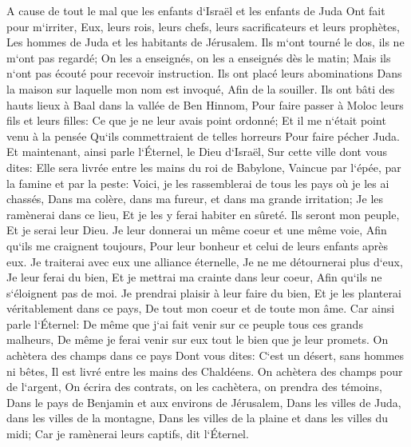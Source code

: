 \verse A cause de tout le mal que les enfants d`Israël et les enfants de Juda Ont fait pour m`irriter, Eux, leurs rois, leurs chefs, leurs sacrificateurs et leurs prophètes, Les hommes de Juda et les habitants de Jérusalem. 
\verse Ils m`ont tourné le dos, ils ne m`ont pas regardé; On les a enseignés, on les a enseignés dès le matin; Mais ils n`ont pas écouté pour recevoir instruction. 
\verse Ils ont placé leurs abominations Dans la maison sur laquelle mon nom est invoqué, Afin de la souiller. 
\verse Ils ont bâti des hauts lieux à Baal dans la vallée de Ben Hinnom, Pour faire passer à Moloc leurs fils et leurs filles: Ce que je ne leur avais point ordonné; Et il me n`était point venu à la pensée Qu`ils commettraient de telles horreurs Pour faire pécher Juda. 
\verse Et maintenant, ainsi parle l`Éternel, le Dieu d`Israël, Sur cette ville dont vous dites: Elle sera livrée entre les mains du roi de Babylone, Vaincue par l`épée, par la famine et par la peste: 
\verse Voici, je les rassemblerai de tous les pays où je les ai chassés, Dans ma colère, dans ma fureur, et dans ma grande irritation; Je les ramènerai dans ce lieu, Et je les y ferai habiter en sûreté. 
\verse Ils seront mon peuple, Et je serai leur Dieu. 
\verse Je leur donnerai un même coeur et une même voie, Afin qu`ils me craignent toujours, Pour leur bonheur et celui de leurs enfants après eux. 
\verse Je traiterai avec eux une alliance éternelle, Je ne me détournerai plus d`eux, Je leur ferai du bien, Et je mettrai ma crainte dans leur coeur, Afin qu`ils ne s`éloignent pas de moi. 
\verse Je prendrai plaisir à leur faire du bien, Et je les planterai véritablement dans ce pays, De tout mon coeur et de toute mon âme. 
\verse Car ainsi parle l`Éternel: De même que j`ai fait venir sur ce peuple tous ces grands malheurs, De même je ferai venir sur eux tout le bien que je leur promets. 
\verse On achètera des champs dans ce pays Dont vous dites: C`est un désert, sans hommes ni bêtes, Il est livré entre les mains des Chaldéens. 
\verse On achètera des champs pour de l`argent, On écrira des contrats, on les cachètera, on prendra des témoins, Dans le pays de Benjamin et aux environs de Jérusalem, Dans les villes de Juda, dans les villes de la montagne, Dans les villes de la plaine et dans les villes du midi; Car je ramènerai leurs captifs, dit l`Éternel. 

